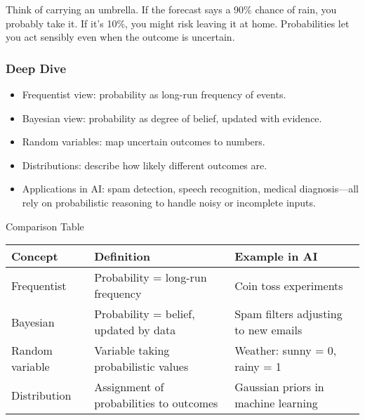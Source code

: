 \documentclass[
  letterpaper,
  DIV=11,
  numbers=noendperiod]{scrreprt}
\providecommand{\tightlist}{%
  \setlength{\itemsep}{0pt}\setlength{\parskip}{0pt}}
\begin{document}
Think of carrying an umbrella. If the forecast says a 90\% chance of
rain, you probably take it. If it's 10\%, you might risk leaving it at
home. Probabilities let you act sensibly even when the outcome is
uncertain.

\subsubsection{Deep Dive}\label{deep-dive-21}

\begin{itemize}
\tightlist
\item
  Frequentist view: probability as long-run frequency of events.
\item
  Bayesian view: probability as degree of belief, updated with evidence.
\item
  Random variables: map uncertain outcomes to numbers.
\item
  Distributions: describe how likely different outcomes are.
\item
  Applications in AI: spam detection, speech recognition, medical
  diagnosis---all rely on probabilistic reasoning to handle noisy or
  incomplete inputs.
\end{itemize}

Comparison Table

\begin{longtable}[]{@{}
  >{\raggedright\arraybackslash}p{}
  >{\raggedright\arraybackslash}p{}
  >{\raggedright\arraybackslash}p{}@{}}
\toprule\noalign{}
\begin{minipage}[b]{\linewidth}\raggedright
Concept
\end{minipage} & \begin{minipage}[b]{\linewidth}\raggedright
Definition
\end{minipage} & \begin{minipage}[b]{\linewidth}\raggedright
Example in AI
\end{minipage} \\
\midrule\noalign{}
\endhead
\bottomrule\noalign{}
\endlastfoot
Frequentist & Probability = long-run frequency & Coin toss
experiments \\
Bayesian & Probability = belief, updated by data & Spam filters
adjusting to new emails \\
Random variable & Variable taking probabilistic values & Weather: sunny
= 0, rainy = 1 \\
Distribution & Assignment of probabilities to outcomes & Gaussian priors
in machine learning \\
\end{longtable}
\end{document}
